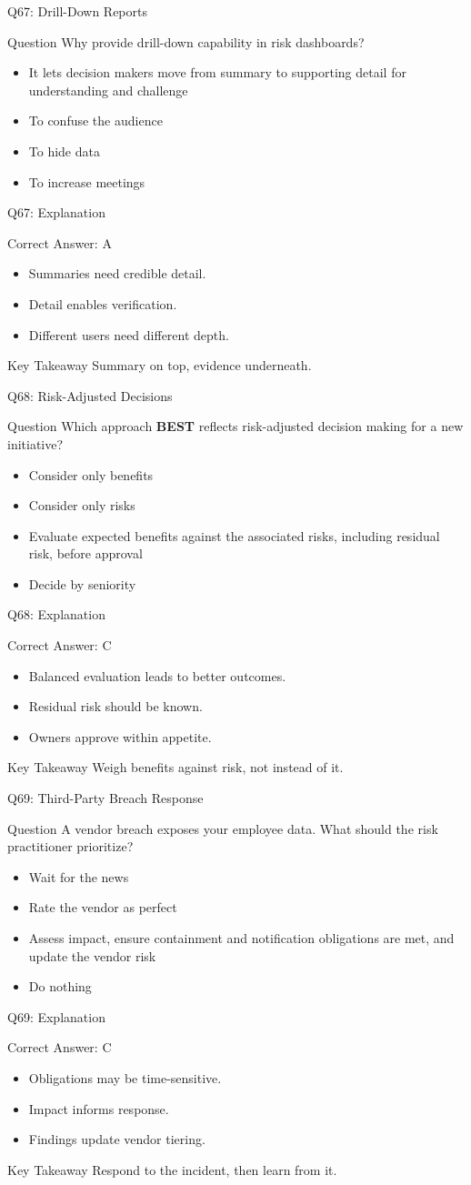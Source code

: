 \documentclass[aspectratio=169]{beamer}
\newcommand{\hq}[7]{%
	\begin{frame}{Q#1: #2}
		\begin{block}{Question}
			#3
		\end{block}
		\begin{itemize}
			#4
		\end{itemize}
	\end{frame}
	\begin{frame}{Q#1: Explanation}
		\begin{block}{Correct Answer: #5}
			\begin{itemize}
				#6
			\end{itemize}
		\end{block}
		\begin{alertblock}{Key Takeaway}
			#7
		\end{alertblock}
	\end{frame}
}
\begin{document}
	\hq{67}{Drill-Down Reports}
	{Why provide drill-down capability in risk dashboards?}
	{\item[\textbf{(A)}] It lets decision makers move from summary to supporting detail for understanding and challenge
		\item[\textbf{(B)}] To confuse the audience
		\item[\textbf{(C)}] To hide data
		\item[\textbf{(D)}] To increase meetings}
	{A}
	{\item Summaries need credible detail.
		\item Detail enables verification.
		\item Different users need different depth.}
	{Summary on top, evidence underneath.}

	\hq{68}{Risk-Adjusted Decisions}
	{Which approach \textbf{BEST} reflects risk-adjusted decision making for a new initiative?}
	{\item[\textbf{(A)}] Consider only benefits
		\item[\textbf{(B)}] Consider only risks
		\item[\textbf{(C)}] Evaluate expected benefits against the associated risks, including residual risk, before approval
		\item[\textbf{(D)}] Decide by seniority}
	{C}
	{\item Balanced evaluation leads to better outcomes.
		\item Residual risk should be known.
		\item Owners approve within appetite.}
	{Weigh benefits against risk, not instead of it.}

	\hq{69}{Third-Party Breach Response}
	{A vendor breach exposes your employee data. What should the risk practitioner prioritize?}
	{\item[\textbf{(A)}] Wait for the news
		\item[\textbf{(B)}] Rate the vendor as perfect
		\item[\textbf{(C)}] Assess impact, ensure containment and notification obligations are met, and update the vendor risk
		\item[\textbf{(D)}] Do nothing}
	{C}
	{\item Obligations may be time-sensitive.
		\item Impact informs response.
		\item Findings update vendor tiering.}
	{Respond to the incident, then learn from it.}
\end{document}
